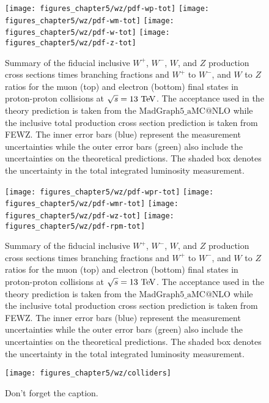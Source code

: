 \begin{figure}[h]
\centering
\texttt{[image: figures\_chapter5/wz/pdf-wp-tot]}
\texttt{[image: figures\_chapter5/wz/pdf-wm-tot]}
\texttt{[image: figures\_chapter5/wz/pdf-w-tot]}
\texttt{[image: figures\_chapter5/wz/pdf-z-tot]}
\caption{Summary of the fiducial inclusive $W^+$, $W^-$, $W$, and $Z$ production cross sections times branching fractions and $W^+$ to $W^-$, and $W$ to $Z$ ratios for the muon (top) and electron (bottom) final states in proton-proton collisions at $\sqrt{s}=13~\mathrm{Te\kern -0.1em V}$. The acceptance used in the theory prediction is taken from the $\mathrm{MadGraph5}\_\mathrm{aMC@NLO}$ while the inclusive total production cross section prediction is taken from FEWZ. The inner error bars (blue) represent the measurement uncertainties while the outer error bars (green) also include the uncertainties on the theoretical predictions. The shaded box denotes the uncertainty in the total integrated luminosity measurement.}
\label{fig:pdf_tot}
\end{figure}


\begin{figure}[h]
\centering
\texttt{[image: figures\_chapter5/wz/pdf-wpr-tot]}
\texttt{[image: figures\_chapter5/wz/pdf-wmr-tot]}
\texttt{[image: figures\_chapter5/wz/pdf-wz-tot]}
\texttt{[image: figures\_chapter5/wz/pdf-rpm-tot]}
\caption{Summary of the fiducial inclusive $W^+$, $W^-$, $W$, and $Z$ production cross sections times branching fractions and $W^+$ to $W^-$, and $W$ to $Z$ ratios for the muon (top) and electron (bottom) final states in proton-proton collisions at $\sqrt{s}=13~\mathrm{Te\kern -0.1em V}$. The acceptance used in the theory prediction is taken from the $\mathrm{MadGraph5}\_\mathrm{aMC@NLO}$ while the inclusive total production cross section prediction is taken from FEWZ. The inner error bars (blue) represent the measurement uncertainties while the outer error bars (green) also include the uncertainties on the theoretical predictions. The shaded box denotes the uncertainty in the total integrated luminosity measurement.}
\label{fig:pdf_rat}
\end{figure}

\begin{figure}[h]
\centering
\texttt{[image: figures\_chapter5/wz/colliders]}
\caption{Don't forget the caption.}
\label{fig:collider}
\end{figure}



